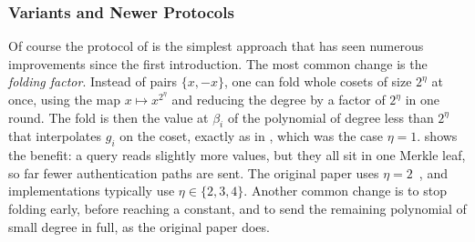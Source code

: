 \documentclass[../../book]{subfiles}
\begin{document}
\subsubsection{Variants and Newer Protocols}\label{subsubsec:fri-variants}

Of course the protocol of  is the simplest approach that has seen numerous improvements since the first introduction.
The most common change is the \emph{folding factor}.
Instead of pairs $\{x, -x\}$, one can fold whole cosets of size $2^\eta$ at once, using the map $x \mapsto x^{2^\eta}$ and reducing the degree by a factor of $2^\eta$ in one round.
The fold is then the value at $\beta_i$ of the polynomial of degree less than $2^\eta$ that interpolates $g_i$ on the coset, exactly as in , which was the case $\eta = 1$.
 shows the benefit: a query reads slightly more values, but they all sit in one Merkle leaf, so far fewer authentication paths are sent.
The original paper uses $\eta = 2$~\cite{bensasson18}, and implementations typically use $\eta \in \{2, 3, 4\}$.
Another common change is to stop folding early, before reaching a constant, and to send the remaining polynomial of small degree in full, as the original paper does.
\end{document}
